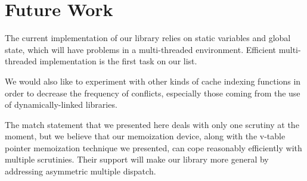 \section{Future Work} %
\label{sec:fw}

The current implementation of our library relies on static variables and global 
state, which will have problems in a multi-threaded environment. Efficient 
multi-threaded implementation is the first task on our list. 

We would also like to experiment with other kinds of cache indexing functions in 
order to decrease the frequency of conflicts, especially those coming from the use 
of dynamically-linked libraries.

The match statement that we presented here deals with only one scrutiny at the 
moment, but we believe that our memoization device, along with the v-table pointer memoization 
technique we presented, can cope reasonably efficiently with multiple scrutinies. 
Their support will make our library more general by addressing asymmetric 
multiple dispatch.
